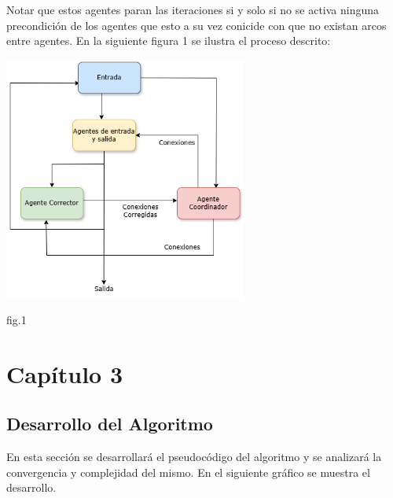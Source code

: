 \documentclass{article}
\begin{document}
        Notar que estos agentes paran las iteraciones si y solo si no se activa ninguna precondición de los agentes que esto a su vez conicide con que no existan arcos entre agentes. En la siguiente figura 1 se ilustra el proceso descrito: \\


        \begin{center}
                \includegraphics[width=0.6\textwidth]{images/AgentArchitecture.drawio.png}
                \begin{center}
                    fig.1
                \end{center}
        \end{center}

\newpage

\section*{ \Huge Capítulo 3}
\label{sec:16}
\subsection*{ \Large Desarrollo del Algoritmo }

 En esta sección se desarrollará el pseudocódigo del algoritmo y se analizará la convergencia y complejidad del mismo. En el siguiente gráfico se muestra el desarrollo.
\end{document}

